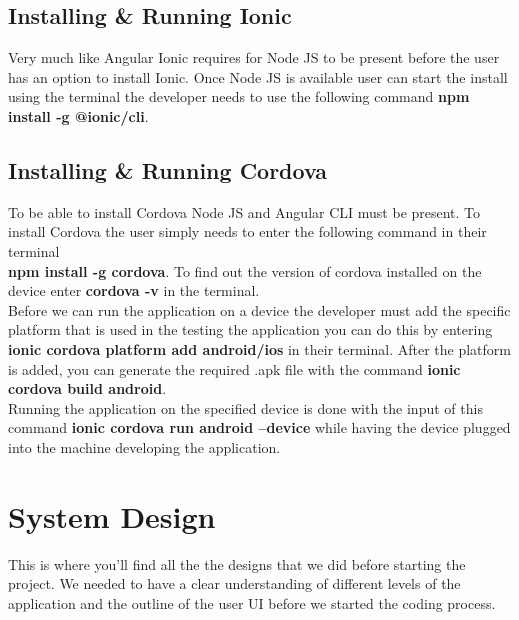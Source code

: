 \documentclass[a4paper,12pt]{report}
\begin{document}
\section{Installing \& Running Ionic }
Very much like Angular Ionic requires for Node JS to be present before the user has an option to install Ionic.
Once Node JS is available user can start the install using the terminal the developer needs to use the following command \textbf{npm install -g @ionic/cli}.

\section{Installing \& Running Cordova }
To be able to install Cordova Node JS and Angular CLI must be present. To install Cordova the user simply needs to enter the following command in their terminal\\ \textbf{npm install -g cordova}. To find out the version of cordova installed on the device enter \textbf{cordova -v} in the terminal.\cite{cordova}\\

Before we can run the application on a device the developer must add the specific platform that is used in the testing the application you can do this by entering\\ \textbf{ionic cordova platform add android/ios} in their terminal.
After the platform is added, you can generate the required .apk file with the command  \textbf{ionic cordova build android}.\\

Running the application on the specified device is done with the input of this command \textbf{ionic cordova run android --device} while having the device plugged into the machine developing the application. \cite{cordovaRun}
\chapter{System Design}
This is where you’ll find all the the designs that we did before starting the project. We needed to have a clear understanding of different levels of the application and the outline of the user UI before we started the coding process.
\end{document}
